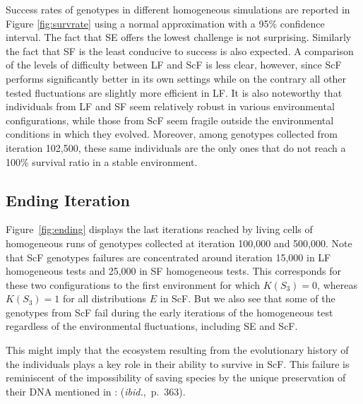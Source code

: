 Success rates of genotypes in different homogeneous simulations are reported in Figure \ref{fig:survrate} using a normal approximation with a 95\% confidence interval. The fact that SE offers the lowest challenge is not surprising. Similarly the fact that SF is the least conducive to success is also expected. A comparison of the levels of difficulty between LF and ScF is less clear, however, since ScF performs significantly better in its own settings while on the contrary all other tested fluctuations are slightly more efficient in LF. It is also noteworthy that individuals from LF and SF seem relatively robust in various environmental configurations, while those from ScF seem fragile outside the environmental conditions in which they evolved. Moreover, among genotypes collected from iteration 102,500, these same individuals are the only ones that do not reach a 100\% survival ratio in a stable environment.

\subsection{Ending Iteration}

Figure~\ref{fig:ending} displays the last iterations reached by living cells of homogeneous runs of genotypes collected at iteration 100,000 and 500,000. Note that ScF genotypes failures are concentrated around iteration 15,000 in LF homogeneous tests and 25,000 in SF homogeneous tests. This corresponds for these two configurations to the first environment for which $K(S_3) = 0$, whereas $K(S_3) = 1$ for all distributions $E$ in ScF. But we also see that some of the genotypes from ScF fail during the early iterations of the homogeneous test regardless of the environmental fluctuations, including SE and ScF.

This might imply that the ecosystem resulting from the evolutionary history of the individuals plays a key role in their ability to survive in ScF. This failure is reminiscent of the impossibility of saving species by the unique preservation of their DNA mentioned in \cite{jablonka2014evolution}:  (\emph{ibid.},~p.~363).

